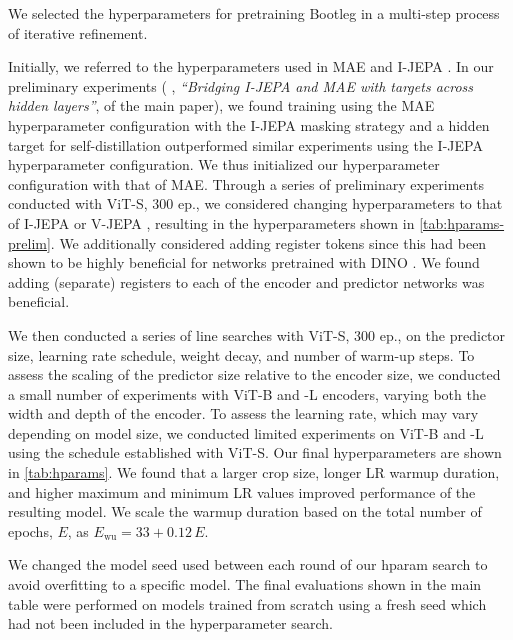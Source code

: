 We selected the hyperparameters for pretraining Bootleg in a multi-step process of iterative refinement.

Initially, we referred to the hyperparameters used in MAE \citep{he2022masked} and I-JEPA \citep{assran2023ijepa}.
In our preliminary experiments (\cf{} \iftoggle{arxiv}{\cref{fig:stabilizing}}{Fig.~2}, \textit{``Bridging I-JEPA and MAE with targets across hidden layers''}, of the main paper), we found training using the MAE hyperparameter configuration with the I-JEPA masking strategy and a hidden target for self-distillation outperformed similar experiments using the I-JEPA hyperparameter configuration.
We thus initialized our hyperparameter configuration with that of MAE.
Through a series of preliminary experiments conducted with ViT-S, 300 ep., we considered changing hyperparameters to that of I-JEPA or V-JEPA \citep{bardes2024vjepa}, resulting in the hyperparameters shown in \cref{tab:hparams-prelim}.
We additionally considered adding register tokens \citep{darcet2024registers} since this had been shown to be highly beneficial for networks pretrained with DINO \citep{darcet2024registers}.
We found adding (separate) registers to each of the encoder and predictor networks was beneficial. %

We then conducted a series of line searches with ViT-S, 300 ep., on the predictor size, learning rate schedule, weight decay, and number of warm-up steps.
To assess the scaling of the predictor size relative to the encoder size, we conducted a small number of experiments with ViT-B and -L encoders, varying both the width and depth of the encoder.
To assess the learning rate, which may vary depending on model size, we conducted limited experiments on ViT-B and -L using the schedule established with ViT-S.
Our final hyperparameters are shown in \cref{tab:hparams}.
We found that a larger crop size, longer LR warmup duration, and higher maximum and minimum LR values improved performance of the resulting model.
We scale the warmup duration based on the total number of epochs, $E$, as $E_\text{wu} = 33 + 0.12 \, E$.

We changed the model seed used between each round of our hparam search to avoid overfitting to a specific model.
The final evaluations shown in the main table were performed on models trained from scratch using a fresh seed which had not been included in the hyperparameter search.

